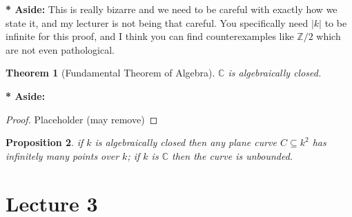 \documentclass[11pt,a4paper]{article}
\newenvironment{asidebar}{%
    \def\FrameCommand{\vrule width 1.5pt \hspace{8pt}}%
    \MakeFramed{\advance\hsize-\width\FrameRestore}%
}{\endMakeFramed}
\newcommand{\aside}[1]{\begin{asidebar}\noindent\textbf{* Aside:} #1\end{asidebar}}
\theoremstyle{plain}
\newtheorem{theorem}{Theorem}[section]
\newtheorem{proposition}[theorem]{Proposition}
\theoremstyle{definition}
\theoremstyle{remark}
\begin{document}
\aside{This is really bizarre and we need to be careful with exactly how we state it, and my lecturer is not being that careful. You specifically need $|k|$ to be infinite for this proof, and I think you can find counterexamples like $\mathbb{Z}/2$ which are not even pathological.}

\begin{theorem}[Fundamental Theorem of Algebra]
    $\mathbb{C}$ is algebraically closed.
\end{theorem}
\aside{
\begin{proof}
    Placeholder (may remove)
\end{proof}
}
\begin{proposition}
    if $k$ is algebraically closed then any plane curve $C \subseteq k^2$ has infinitely many points over $k$; if $k$ is $\mathbb{C}$ then the curve is unbounded. 
\end{proposition}

\section*{Lecture 3}

\active 
\end{document}
